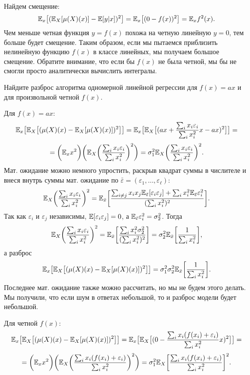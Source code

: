 \documentclass[12pt,fleqn]{article}
\begin{document}
\begin{esSolution}
    Найдем смещение:
    \[
    \mathbb{E}_{x}\bigl[(\mathbb{E}_{X}[\mu(X)(x)] - \mathbb{E}[y|x] )^2\bigr] = \mathbb{E}_{x}\bigl[(0 -  f(x))^2\bigr] = 
    \mathbb{E}_x f^2(x).
    \]
    Чем меньше четная функция $y=f(x)$ похожа на четную линейную $y = 0$, тем больше будет смещение. Таким образом, если мы пытаемся приблизить нелинейную функцию $f(x)$ в классе линейных, мы получаем большое смещение. Обратите внимание, что если бы $f(x)$ не была четной, мы бы не смогли просто аналитически вычислить интегралы.  
\end{esSolution}

\begin{vkProblem}
    Найдите разброс алгоритма одномерной линейной регрессии для $f(x) = ax$ и для произвольной четной $f(x)$. 
\end{vkProblem}
\begin{esSolution}
    Для $f(x) = ax:$
    \[
    \mathbb{E}_{x}\bigl[\mathbb{E}_{X}\bigl[(\mu(X)(x) - \mathbb{E}_{X}[\mu(X)(x)] )^2\bigr]\bigr] = 
    \mathbb{E}_{x}\bigl[\mathbb{E}_{X}\bigl[(
    a x +  \frac{\sum_i x_i \varepsilon_i}{\sum_i x_i^2} x - ax
     )^2\bigr]\bigr] =
     \]
     \[ =\biggl( \mathbb{E}_{x} x^2 \biggr) 
     \biggl (\mathbb{E}_{X}\biggl(
     \frac{\sum_i x_i \varepsilon_i}{\sum_i x_i^2} 
    \biggr )^2\biggr) = \sigma_1^2
    \mathbb{E}_{X}
    \biggl (\frac{\sum_i x_i \varepsilon_i}{\sum_i x_i^2} \biggr)
    ^2.
    \]
    Мат. ожидание можно немного упростить, раскрыв квадрат суммы в числителе и внеся внутрь суммы мат. ожидание по $\bar \varepsilon = (\varepsilon_1, \dots, \varepsilon_\ell)$:
    \[
    \mathbb{E}_{X}\biggl(
    \frac{\sum_i x_i \varepsilon_i}{\sum_i x_i^2} 
    \biggr )^2 = \mathbb{E}_{\bar x} \biggl[ \frac {\sum_{i \ne j} x_i x_j \mathbb{E}_{\bar \varepsilon } [\varepsilon_i \varepsilon_j] +
        \sum_i x_i^2 \mathbb{E}_{\bar \varepsilon } \varepsilon_i^2 } {(\sum_i x_i^2)^2} 
     \biggr].
    \]
    Так как $\varepsilon_i$ и $\varepsilon_j$ независимы, $\mathbb{E}[\varepsilon_i \varepsilon_j] = 0$, а $\mathbb{E}_{\bar \varepsilon } \varepsilon_i^2 = \sigma_2^2$. Тогда
    \[
    \mathbb{E}_{X}\biggl(
    \frac{\sum_i x_i \varepsilon_i}{\sum_i x_i^2} 
    \biggr )^2 = \mathbb{E}_{\bar x} \biggl[ \frac {
        \sum_i x_i^2 \sigma_2^2} {(\sum_i x_i^2)^2} 
    \biggr] = \sigma_2^2 \mathbb{E}_{\bar x} \biggl[ \frac 1 {\sum_i x_i^2} \biggr],
    \]
    а разброс
    \[
    \mathbb{E}_{x}\bigl[\mathbb{E}_{X}\bigl[(\mu(X)(x) - \mathbb{E}_{X}[\mu(X)(x)] )^2\bigr]\bigr] = 
     \sigma_1^2 \sigma_2^2
    \mathbb{E}_{\bar x} \biggl[ \frac 1 {\sum_i x_i^2} \biggr].
    \]
    Последнее мат. ожидание также можно рассчитать, но мы не будем этого делать. Мы получили, что если шум в ответах небольшой, то и разброс модели будет небольшой. 
    
    Для четной $f(x)$:
    \[
    \mathbb{E}_{x}\bigl[\mathbb{E}_{X}\bigl[(\mu(X)(x) - \mathbb{E}_{X}[\mu(X)(x)] )^2\bigr]\bigr] = 
    \mathbb{E}_{x}\bigl[\mathbb{E}_{X}\bigl[( 0 -
    \frac{\sum_i x_i (f(x_i)+\varepsilon_i)}{\sum_i x_i^2} x
    )^2\bigr]\bigr] =
    \]
    \[ =\biggl( \mathbb{E}_{x} x^2 \biggr) 
    \biggl (\mathbb{E}_{X}\biggl(
    \frac{\sum_i x_i (f(x_i)+\varepsilon_i)}{\sum_i x_i^2}
    \biggr )^2\biggr) = \sigma_1^2
    \mathbb{E}_{X}\biggl[
    \frac{\sum_i x_i (f(x_i)+\varepsilon_i)}{\sum_i x_i^2}
    \biggr ]^2.
    \]
\end{esSolution}
\end{document}
